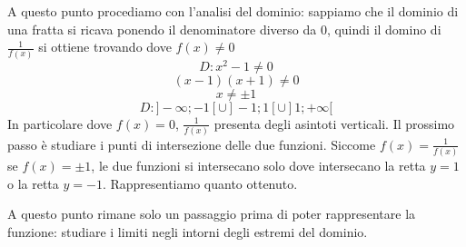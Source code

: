 \documentclass{article}     %
\begin{document}
        A questo punto procediamo con l'analisi del dominio: sappiamo che il dominio di una fratta si ricava ponendo il denominatore diverso da $0$, quindi il domino di $\frac{1}{f(x)}$ si ottiene trovando dove $f(x)\neq0$
        \[D: x^2-1\neq 0\]
        \[(x-1)(x+1)\neq 0\]
        \[x\neq \pm 1\]
        \[D: ]-\infty;-1[\cup]-1;1[\cup]1;+\infty[\]
        In particolare dove $f(x)=0$, $\frac{1}{f(x)}$ presenta degli asintoti verticali. Il prossimo passo è studiare i punti di intersezione delle due funzioni. Siccome $f(x)=\frac{1}{f(x)}$ se $f(x)=\pm 1$, le due funzioni si intersecano solo dove intersecano la retta $y=1$ o la retta $y=-1$. Rappresentiamo quanto ottenuto.
        \begin{figure}[h]
            \centering
        \end{figure}
        A questo punto rimane solo un passaggio prima di poter rappresentare la funzione: studiare i limiti negli intorni degli estremi del dominio. 
\end{document}
